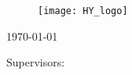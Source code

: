 \begin{titlepage}{
    \centering
    \begin{figure}[t]
        \centering
        \texttt{[image: HY\_logo]}
    \end{figure}
    
    \mythesis \par
    \mysubject \par
    \mySpecSubject \par
    
    \bigskip
    \MakeUppercase{\mytitle}
    
    \bigskip
    \myname
    
    \mydate\today
    
    \vfill
    
    Supervisors: \par
    \mysupervisors \par
    \bigskip
    \bigskip
    \bigskip
    \MakeUppercase{\myuni} \par
    \MakeUppercase{\myfaculty} \par
    \MakeUppercase{\mydept} \par
    \MakeUppercase{\mysubject} \par
    \addressFirst \par
    \addressSecond \par
}
\end{titlepage}